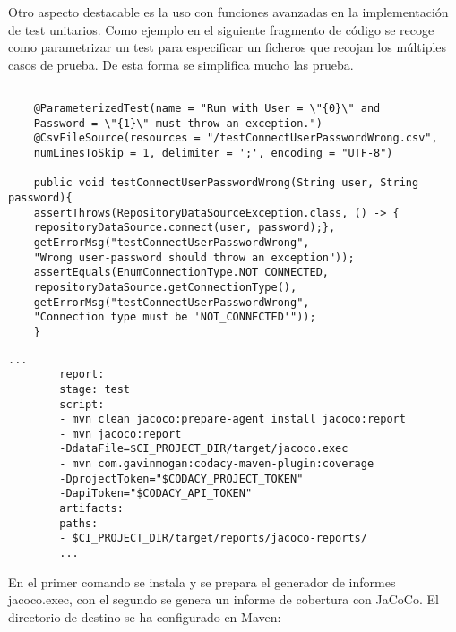 Otro aspecto destacable es la uso con funciones avanzadas en la implementación de test unitarios. 
Como ejemplo en el siguiente fragmento de código se recoge como parametrizar un test para especificar un ficheros que recojan los múltiples casos de prueba.
De esta forma se simplifica mucho las prueba.
{\tiny 
	\begin{lstlisting}[breaklines]
	
	@ParameterizedTest(name = "Run with User = \"{0}\" and 
	Password = \"{1}\" must throw an exception.")
	@CsvFileSource(resources = "/testConnectUserPasswordWrong.csv", 
	numLinesToSkip = 1, delimiter = ';', encoding = "UTF-8")
	
	public void testConnectUserPasswordWrong(String user, String password){
	assertThrows(RepositoryDataSourceException.class, () -> {
	repositoryDataSource.connect(user, password);},
	getErrorMsg("testConnectUserPasswordWrong", 
	"Wrong user-password should throw an exception"));
	assertEquals(EnumConnectionType.NOT_CONNECTED, 
	repositoryDataSource.getConnectionType(),
	getErrorMsg("testConnectUserPasswordWrong", 
	"Connection type must be 'NOT_CONNECTED'"));
	}
	\end{lstlisting}
}

\begin{minipage}{\linewidth}
	{\tiny
		\begin{lstlisting}[breaklines]
		...
		report:
		stage: test
		script:
		- mvn clean jacoco:prepare-agent install jacoco:report
		- mvn jacoco:report 
		-DdataFile=$CI_PROJECT_DIR/target/jacoco.exec
		- mvn com.gavinmogan:codacy-maven-plugin:coverage 
		-DprojectToken="$CODACY_PROJECT_TOKEN" 
		-DapiToken="$CODACY_API_TOKEN"
		artifacts:
		paths:
		- $CI_PROJECT_DIR/target/reports/jacoco-reports/
		...		
		\end{lstlisting}
	}
\end{minipage}

En el primer comando se instala y se prepara el generador de informes jacoco.exec, con el segundo se genera un informe de cobertura con JaCoCo. El directorio de destino se ha configurado en Maven:

